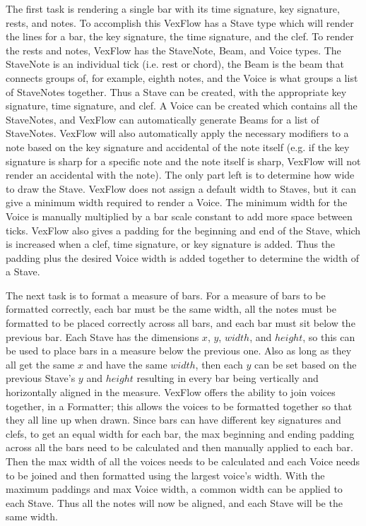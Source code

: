 \documentclass[letterpaper,12pt]{article}
\begin{document}
The first task is rendering a single bar with its time signature, key signature, rests, and notes. To accomplish this
VexFlow has a Stave type which will render the lines for a bar, the key signature, the time signature, and the clef. To
render the rests and notes, VexFlow has the StaveNote, Beam, and Voice types. The StaveNote is an individual tick (i.e.
rest or chord), the Beam is the beam that connects groups of, for example, eighth notes, and the Voice is what groups a
list of StaveNotes together. Thus a Stave can be created, with the appropriate key signature, time signature, and clef.
A Voice can be created which contains all the StaveNotes, and VexFlow can automatically generate Beams for a list of
StaveNotes. VexFlow will also automatically apply the necessary modifiers to a note based on the key signature and
accidental of the note itself (e.g. if the key signature is sharp for a specific note and the note itself is sharp,
VexFlow will not render an accidental with the note). The only part left is to determine how wide to draw the Stave.
VexFlow does not assign a default width to Staves, but it can give a minimum width required to render a Voice. The
minimum width for the Voice is manually multiplied by a bar scale constant to add more space between ticks. VexFlow also
gives a padding for the beginning and end of the Stave, which is increased when a clef, time signature, or key signature
is added. Thus the padding plus the desired Voice width is added together to determine the width of a Stave.

The next task is to format a measure of bars. For a measure of bars to be formatted correctly, each bar must be the same
width, all the notes must be formatted to be placed correctly across all bars, and each bar must sit below the previous
bar. Each Stave has the dimensions $ x $, $ y $, $ width $, and $ height $, so this can be used to place bars in a
measure below the previous one. Also as long as they all get the same $ x $ and have the same $ width $, then each $ y $
can be set based on the previous Stave's $ y $ and $ height $ resulting in every bar being vertically and horizontally
aligned in the measure. VexFlow offers the ability to join voices together, in a Formatter; this allows the voices to be
formatted together so that they all line up when drawn. Since bars can have different key signatures and clefs, to get
an equal width for each bar, the max beginning and ending padding across all the bars need to be calculated and then
manually applied to each bar. Then the max width of all the voices needs to be calculated and each Voice needs to be
joined and then formatted using the largest voice's width. With the maximum paddings and max Voice width, a common width
can be applied to each Stave. Thus all the notes will now be aligned, and each Stave will be the same width.
\end{document}
